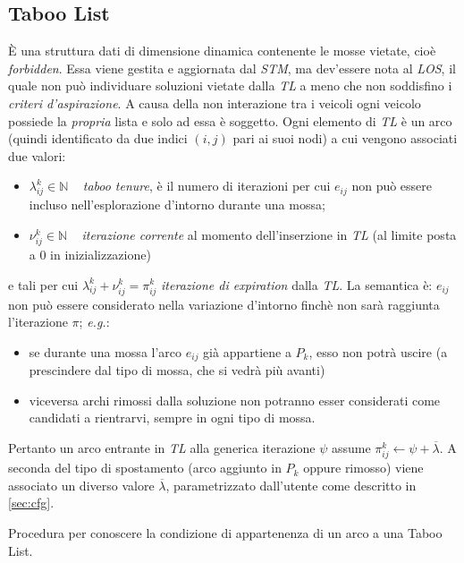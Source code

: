 \subsection{Taboo List} %
	È una struttura dati di dimensione dinamica contenente le mosse vietate, cioè \emph{forbidden}. Essa viene gestita e aggiornata dal \emph{STM}, ma dev'essere
	nota al \emph{LOS}, il quale non può individuare soluzioni vietate dalla \emph{TL} a meno che non soddisfino i \emph{criteri d'aspirazione}.
	A causa della non interazione tra i veicoli ogni veicolo possiede la \emph{propria} lista e solo ad essa è soggetto.
	Ogni elemento di \emph{TL} è un arco (quindi identificato da due indici $(i,j)$ pari ai suoi nodi) a cui vengono associati due valori:
	\begin{itemize} 
	  \item $\lambda_{ij}^k \in \mathbb{N}\;\;\;$ \emph{taboo tenure}, è il numero di iterazioni per cui $e_{ij}$ non può essere incluso nell'esplorazione d'intorno durante una mossa;
	  \item $\nu_{ij}^k \in \mathbb{N}\;\;\;$ \emph{iterazione corrente} al momento dell'inserzione in \emph{TL} (al limite posta a 0 in inizializzazione)
	\end{itemize}
	e tali per cui $\lambda_{ij}^k+\nu_{ij}^k = \pi_{ij}^k$ \emph{iterazione di expiration} dalla \emph{TL}.
	La semantica è: $e_{ij}$ non può essere considerato nella variazione d'intorno finchè non sarà raggiunta l'iterazione $\pi$; \emph{e.g.}:
	\begin{itemize}
	  \item se durante una mossa l'arco $e_{ij}$ già appartiene a $P_k$, esso non potrà uscire (a prescindere dal tipo di mossa, che si vedrà più avanti)
	  \item  viceversa archi rimossi dalla soluzione non potranno esser considerati come candidati a rientrarvi, sempre in ogni tipo di mossa.
	\end{itemize}
	Pertanto un arco entrante in \emph{TL} alla generica iterazione $\psi$ assume $\pi_{ij}^k\leftarrow\psi+\overline{\lambda}$.
	A seconda del tipo di spostamento (arco aggiunto in $P_k$ oppure rimosso) viene associato un diverso valore $\overline{\lambda}$,
	 parametrizzato dall'utente come descritto in \ref{sec:cfg}.	
	\begin{algorithm}
	 \SetAlgoLined	 
	\caption{Procedura per conoscere la condizione di appartenenza di un arco a una Taboo List.}
	\end{algorithm}
	
